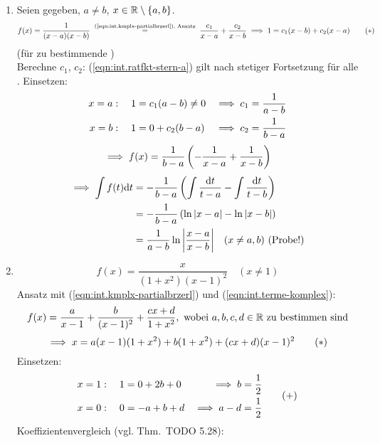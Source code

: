 \documentclass[12pt]{scrreprt}
\begin{document}
\begin{bsp*}
  \begin{enumerate}
  \item Seien  gegeben, $a\ne b$,
    $x\in\mathbb{R}\setminus\{a,b\}$. \begin{equation} \label{eqn:int.ratfkt-stern-a}
      f(x)=\frac{1}{(x-a)(x-b)}
    \nach{=}{(\ref{eqn:int.kmplx-partialbrzerl}), Ansatz}
    \frac{c_1}{x-a}+\frac{c_2}{x-b} \folgt 1=c_1(x-b)+c_2(x-a)
    \tag{$*$} \end{equation}
    (für zu bestimmende )\\
    Berechne $c_1$, $c_2$: (\ref{eqn:int.ratfkt-stern-a}) gilt nach
    stetiger Fortsetzung für alle . Einsetzen:
    \begin{align*}
      x=a &:\quad 1=c_1(a-b)\ne0 &\implies c_1 = \frac{1}{a-b} \\
      x=b &:\quad 1=0+c_2(b-a)   &\implies c_2 = \frac{1}{b-a}
    \end{align*}
    \[\implies f(x)= \frac{1}{b-a}\left(-\frac{1}{x-a}+\frac{1}{x-b}\right)\]
    \begin{align*}
      \implies \int{f(t)\mathrm{d}t} &=
      -\frac{1}{b-a}\left(\int{\frac{\mathrm{d}t}{t-a}}-\int{\frac{\mathrm{d}t}{t-b}}\right)\\
      &= -\frac{1}{b-a}\left(\ln{\left\lvert x-a\right\lvert}-\ln{\left\lvert x-b\right\lvert}\right)
      \\ &= \frac{1}{a-b}\ln{\left\lvert\frac{x-a}{x-b}\right\lvert} \quad (x\ne a,b) \ \mathrm{(Probe!)}
    \end{align*}
  \item \[f(x)=\frac{x}{(1+x^2)(x-1)^2}\quad(x\ne1)\]
    Ansatz mit (\ref{eqn:int.kmplx-partialbrzerl}) und
    (\ref{eqn:int.terme-komplex}):
    \[f(x)=\frac{a}{x-1}+\frac{b}{(x-1)^2}+\frac{cx+d}{1+x^2},\
    \text{wobei}\ a,b,c,d\in\mathbb{R}\ \text{zu bestimmen sind}\]
    \begin{equation}
      \label{eqn:int.ratfkt-stern-b}
      \implies x=a(x-1)(1+x^2)+b(1+x^2)+(cx+d)(x-1)^2 \tag{$*$}
    \end{equation}
    Einsetzen:
    \begin {equation} \label{eqn:int.ratfkt-plus} \begin{aligned}
      x=1 &:\quad 1=0+2b+0 &\implies b=\frac12 \\
      x=0 &:\quad 0=-a+b+d &\implies a-d=\frac12
    \end{aligned} \tag{$+$} \end{equation}
    Koeffizientenvergleich (vgl. Thm.~TODO 5.28):
    \begin{equation} \label{eqn:int.ratfkt-doppelplus}\begin{aligned}

\end{aligned}
\end{equation}
\end{enumerate}
\end{bsp*}
\end{document}
